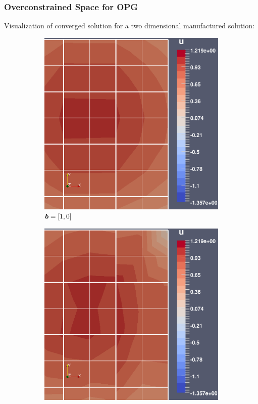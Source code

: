 \begin{frame}
\frametitle{Overconstrained Space for OPG}

Visualization of converged solution for a two dimensional manufactured solution:

\newcommand*{\figurepath}{../manuscript/figures}%
\begin{figure}[!h]
    \centering
    \begin{subfigure}{0.485\textwidth}
        \includegraphics[width=\textwidth]{./results/data/manufactured_2d/opgc_man_2d_bx.eps}
        \caption{$\mathit{\bm{{b}}} = [1,0]$}
    \end{subfigure}
\hfill
    \begin{subfigure}{0.485\textwidth}
        \includegraphics[width=\textwidth]{./results/data/manufactured_2d/opgc_man_2d_bxy.eps}

\end{subfigure}
\end{figure}
\end{frame}
